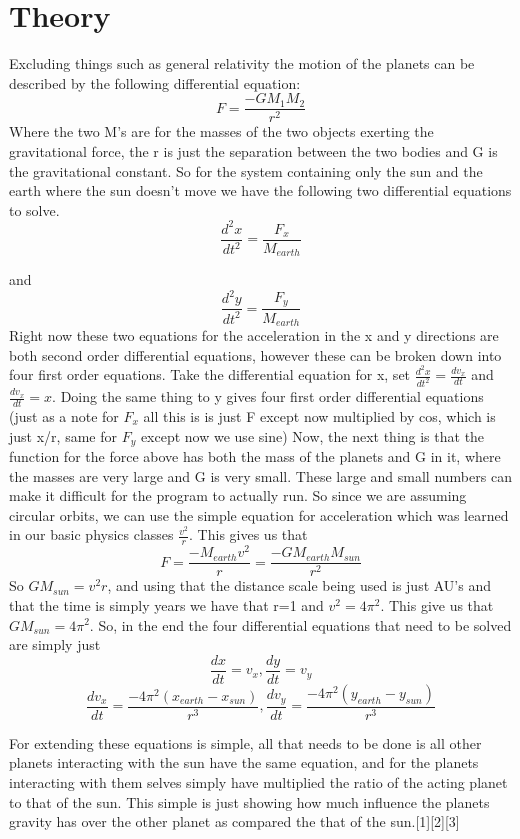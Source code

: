 \documentclass[12pt,righttag]{article}
\begin{document}
	
	\section{Theory}
Excluding things such as general relativity the motion of the planets can be described by the following differential equation:
\[F=\frac{-GM_1 M_2}{r^2}\]
 Where the two M's are for the masses of the two objects exerting the gravitational force, the r is just the separation between the two bodies and G is the gravitational constant. So for the system containing only the sun and the earth where the sun doesn't move we have the following two differential equations to solve.
 \[\frac{d^2x}{dt^2}=\frac{F_x}{M_{earth}}\]
 
 and
  \[\frac{d^2y}{dt^2}=\frac{F_y}{M_{earth}}\]
  Right now these two equations for the acceleration in the x and y directions are both second order differential equations, however these can be broken down into four first order equations. Take the differential equation for x, set $\frac{d^2x}{dt^2}=\frac{dv_x}{dt}$ and $\frac{dv_x}{dt}=x$. Doing the same thing to y gives four first order differential equations (just as a note for $F_x$ all this is is just F except now multiplied by cos, which is just x/r, same for $F_y$ except now we use sine) Now, the next thing is that the function for the force above has both the mass of the planets and G in it, where the masses are very large and G is very small. These large and small numbers can make it difficult for the program to actually run. So since we are assuming circular orbits, we can use the simple equation for acceleration which was learned in our basic physics classes $\frac{v^2}{r}$. This gives us that
  \[F=\frac{-M_{earth}v^2}{r}=\frac{-GM_{earth}M_{sun}}{r^2}\]
  So $GM_{sun}=v^2r$, and using that the distance scale being used is just AU's and that the time is simply years we have that r=1 and $v^2=4\pi^2$. This give us that $GM_{sun}=4\pi^2$. So, in the end the four differential equations that need to be solved are simply just
  \[\frac{dx}{dt}=v_x,    \frac{dy}{dt}=v_y\]
  \[\frac{dv_x}{dt}=\frac{-4\pi^2(x_{earth}-x_{sun})}{r^3}, \frac{dv_y}{dt}=\frac{-4\pi^2(y_{earth}-y_{sun})}{r^3}\]
  
  For extending these equations is simple, all that needs to be done is all other planets interacting with the sun have the same equation, and for the planets interacting with them selves simply have multiplied the ratio of the acting planet to that of the sun. This simple is just showing how much influence the planets gravity has over the other planet as compared the that of the sun.[1][2][3]
 
\end{document}
